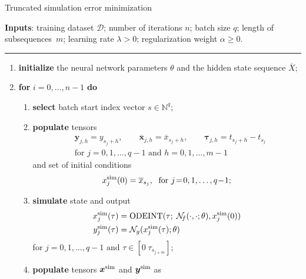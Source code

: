 \documentclass{article} %
\newcommand{\NN}{\mathcal{N}} %
\newcommand{\batchsize}{q}
\newcommand{\seqlen}{m}
\newcommand{\numiter}{n}
\newcommand{\tens}[1]{\bm{#1}}
\newcommand{\Did}{{\mathcal{D}}}
\newcommand{\simul}[1]{{#1}^{\rm sim}}
\newcommand{\hidden}[1]{\overline{#1}}
\newcommand{\est}{}
\renewcommand{\theenumi}{\arabic{enumi}}
\renewcommand{\theenumii}{\arabic{enumii}}
\begin{document}
\begin{algorithm}%
	\caption{Truncated simulation error minimization}
	\label{algo:minibatch_multistep_simulation}
\small
	\textbf{Inputs}: training dataset $\Did$; number of iterations $n$; batch size $\batchsize$; length of subsequences~$\seqlen$; learning rate $\lambda>0$;  regularization weight $\alpha \geq 0$.
\vspace*{-.0cm}\hrule\vspace*{.0cm}
	\begin{enumerate}[label=\arabic*., ref=\theenumi{}]
        \item  \textbf{initialize} the neural network parameters $\theta$ and the hidden  state sequence  $\hidden{X}$; 
		\item  \textbf{for} $i=0,\ldots,\numiter-1$ \textbf{do}
		\begin{enumerate}[label=\theenumi{}.\arabic*., ref=\theenumi{}.\theenumii{}]
			\item \textbf{select} batch start index  vector $s \in \mathbb{N}^q$;
			\item \textbf{populate} tensors
			\begin{align*}
			& {{\tens{y}}}_{j,h}=y_{s_j+h}, \qquad
			 \hidden{{\tens{x}}}_{j,h}=\hidden{x}_{s_j+h}, \qquad
			 {{\tens{\tau}}}_{j,h}={t_{s_j+h} - t_{s_j}}\\
			 & \textrm{for  } j\!=\!0,1,\dots,\batchsize\!-\!1 \textrm{\ \ and\ \ } h\!=\!0,1,\dots,\seqlen\!-\!1
			\end{align*}
			and set of initial conditions
			\begin{equation*}
			{x}^{\mathrm{sim}}_{j}(0) = \hidden{x}_{s_j}, 
			\textrm{\; for }j\!=\!0,1,\dots,\batchsize\!-\!1;
			\end{equation*}
			\item  \textbf{simulate} state and output   
 			\begin{align*} 
 			\simul{{x}}_{j}(\tau) &= \text{ODEINT}(\tau;\; \NN_{\!f}(\cdot, \cdot; \theta), {x}^{\mathrm{sim}}_{j}(0) )  \\ 	
 {{y}}_{j}^{\mathrm{sim}}(\tau)  &= \NN_{g}(\simul{{x}}_{j}(\tau);\theta) %
\end{align*} 
 for $j\!=\!0,1,\dots,\batchsize\!-\!1 \textrm{\ \ and\ \ }  \tau \in [0\; \tau_{s_{j+m}}]$;
\item  \textbf{populate} tensors $\simul{\est{\tens{x}}}$ and $\simul{{\tens{y}}}$ as   
\begin{align*}

\end{align*}
\end{enumerate}
\end{enumerate}
\end{algorithm}
\end{document}
